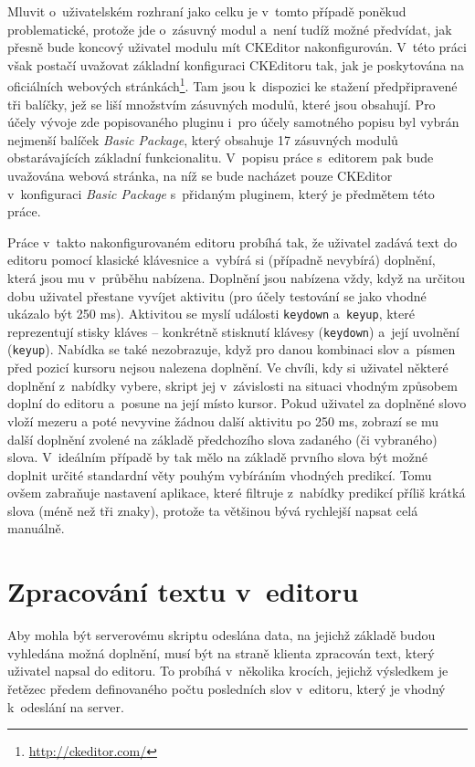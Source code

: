\documentclass[a4paper,11pt,openany]{book} %
\begin{document}
Mluvit o~uživatelském rozhraní jako celku je v~tomto případě poněkud problematické, protože jde o~zásuvný modul a~není tudíž možné předvídat, jak přesně bude koncový uživatel modulu mít CKEditor nakonfigurován. V~této práci však postačí uvažovat základní konfiguraci CKEditoru tak, jak je poskytována na oficiálních webových stránkách\footnote{\url{http://ckeditor.com/}}. Tam jsou k~dispozici ke stažení předpřipravené tři balíčky, jež se liší množstvím zásuvných modulů, které jsou obsahují. Pro účely vývoje zde popisovaného pluginu i~pro účely samotného popisu byl vybrán nejmenší balíček {\it Basic Package}, který obsahuje 17 zásuvných modulů obstarávajících základní funkcionalitu. V~popisu práce s~editorem pak bude uvažována webová stránka, na níž se bude nacházet pouze CKEditor v~konfiguraci {\it Basic Package} s~přidaným pluginem, který je předmětem této práce.

Práce v~takto nakonfigurovaném editoru probíhá tak, že uživatel zadává text do editoru pomocí klasické klávesnice a~vybírá si (případně nevybírá) doplnění, která jsou mu v~průběhu nabízena. Doplnění jsou nabízena vždy, když na určitou dobu uživatel přestane vyvíjet aktivitu (pro účely testování se jako vhodné ukázalo být 250 ms). Aktivitou se myslí události {\tt keydown} a~{\tt keyup}, které reprezentují stisky kláves -- konkrétně stisknutí klávesy ({\tt keydown}) a~její uvolnění ({\tt keyup}). Nabídka se také nezobrazuje, když pro danou kombinaci slov a~písmen před pozicí kursoru nejsou nalezena doplnění. Ve chvíli, kdy si uživatel některé doplnění z~nabídky vybere, skript jej v~závislosti na situaci vhodným způsobem doplní do editoru a~posune na její místo kursor. Pokud uživatel za doplněné slovo vloží mezeru a poté nevyvine žádnou další aktivitu po 250 ms, zobrazí se mu další doplnění zvolené na základě předchozího slova zadaného (či vybraného) slova. V~ideálním případě by tak mělo na základě prvního slova být možné doplnit určité standardní věty pouhým vybíráním vhodných predikcí. Tomu ovšem zabraňuje nastavení aplikace, které filtruje z~nabídky predikcí příliš krátká slova (méně než tři znaky), protože ta většinou bývá rychlejší napsat celá manuálně.

\section{Zpracování textu v~editoru}

Aby mohla být serverovému skriptu odeslána data, na jejichž základě budou vyhledána možná doplnění, musí být na straně klienta zpracován text, který uživatel napsal do editoru. To probíhá v~několika krocích, jejichž výsledkem je řetězec předem definovaného počtu posledních slov v~editoru, který je vhodný k~odeslání na server.
\end{document}
